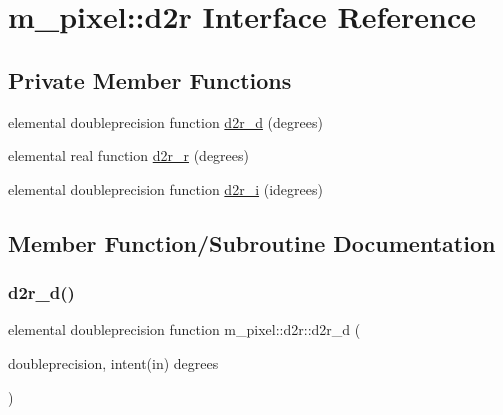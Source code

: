 \hypertarget{interfacem__pixel_1_1d2r}{}\section{m\+\_\+pixel\+:\+:d2r Interface Reference}
\label{interfacem__pixel_1_1d2r}
\subsection*{Private Member Functions}
\begin{DoxyCompactItemize}
\item 
elemental doubleprecision function \mbox{\hyperlink{interfacem__pixel_1_1d2r_af751aab2bc7a9dda2ef1d9d00bbec141}{d2r\+\_\+d}} (degrees)
\item 
elemental real function \mbox{\hyperlink{interfacem__pixel_1_1d2r_a24689b2e99235ea61bce52bb58e00d03}{d2r\+\_\+r}} (degrees)
\item 
elemental doubleprecision function \mbox{\hyperlink{interfacem__pixel_1_1d2r_a3de09014ead770851af96d9512620267}{d2r\+\_\+i}} (idegrees)
\end{DoxyCompactItemize}


\subsection{Member Function/\+Subroutine Documentation}
\mbox{\label{interfacem__pixel_1_1d2r_af751aab2bc7a9dda2ef1d9d00bbec141}} 
\subsubsection{\texorpdfstring{d2r\+\_\+d()}{d2r\_d()}}
{\footnotesize\ttfamily elemental doubleprecision function m\+\_\+pixel\+::d2r\+::d2r\+\_\+d (\begin{DoxyParamCaption}\item[{doubleprecision, intent(in)}]{degrees }\end{DoxyParamCaption})\hspace{0.3cm}{\ttfamily [private]}}

\mbox{\label{interfacem__pixel_1_1d2r_a3de09014ead770851af96d9512620267}} 
